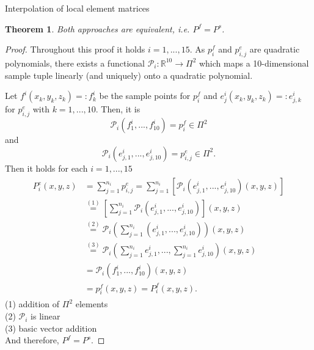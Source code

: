 \documentclass[a4paper,11pt,reqno]{amsart}
\numberwithin{figure}{section}
\numberwithin{table}{section}
\def\RR{\mathbb{R}}
\def\P{\mathcal{P}}
\newtheorem{theorem}{Theorem}
\begin{document}
\begin{section}{Interpolation of local element matrices}
\begin{theorem}
\label{theorem:equivalence}
Both approaches are equivalent, i.e. $P^f = P^s$.
\end{theorem}
\begin{proof}
Throughout this proof it holds $i = 1,...,15$.
As $p^f_i$ and $p^e_{i,j}$ are quadratic polynomials, there exists 
a functional $\P_i : \RR^{10} \rightarrow \Pi^2$ which maps a
10-dimensional sample tuple linearly (and uniquely) 
onto a quadratic polynomial.

Let $f^i(x_k,y_k,z_k) =:f_k^i$ be the sample points
for $p^f_i$ and $e^i_j(x_k,y_k,z_k) =:e_{j,k}^i$ for $p^e_{i,j}$
with $k = 1,...,10$.
Then, it is
\begin{equation*}
\P_i(f^i_1,...,f^i_{10}) = p_i^f \in \Pi^2
\end{equation*}
and
\begin{equation*}
\P_i(e^i_{j,1},...,e^i_{j,10}) = p_{i,j}^e \in \Pi^2.
\end{equation*}
Then it holds for each $i= 1,...,15$
\begin{align*}
\begin{split}
P^e_i(x,y,z) &= \sum_{j=1}^{n_i} p^e_{i,j} 
 = \sum_{j=1}^{n_i}\left[\P_i\left(e^i_{j,1},...,e^i_{j,10}\right)(x,y,z)\right] \\
 &\stackrel{(1)}{=} \left[\sum_{j=1}^{n_i}\P_i\left(e^i_{j,1},...,e^i_{j,10}\right)\right](x,y,z) \\
 &\stackrel{(2)}{=} \P_i\left(\sum_{j=1}^{n_i}\left(e^i_{j,1},...,e^i_{j,10}\right)\right)(x,y,z) \\
 &\stackrel{(3)}{=} \P_i\left(\sum_{j=1}^{n_i}e^i_{j,1},...,\sum_{j=1}^{n_i}e^i_{j,10}\right)(x,y,z) \\
 &= \P_i\left(f^i_1,...,f^i_{10}\right)(x,y,z) \\
 &= p_i^f(x,y,z) = P_i^f(x,y,z).
\end{split}
\end{align*}
(1) addition of $\Pi^2$ elements\\
(2) $\P_i$ is linear \\
(3) basic vector addition\\
And therefore, $P^f = P^s$.
\end{proof}

\end{section}





\end{document}
